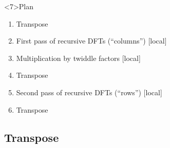 \documentclass[xcolor={rgb,x11names,svgnames},rgb,x11names,svgnames]{beamer}
\begin{document}
\begin{frame}[label=6steps,fragile]
\begin{overlayarea}{\textwidth}{5cm}
  \begin{exampleblock}<7>{Plan}
    \begin{enumerate}
    \item Transpose
    \item First pass of recursive DFTs (``columns'')  \hfill \alert{[local]}
    \item Multiplication by twiddle factors  \hfill \alert{[local]}
    \item Transpose
    \item Second pass of recursive DFTs (``rows'')     \hfill \alert{[local]}
    \item Transpose
    \end{enumerate}
  \end{exampleblock}
\end{overlayarea}
\end{frame}


\subsection{Transpose}
\end{document}
